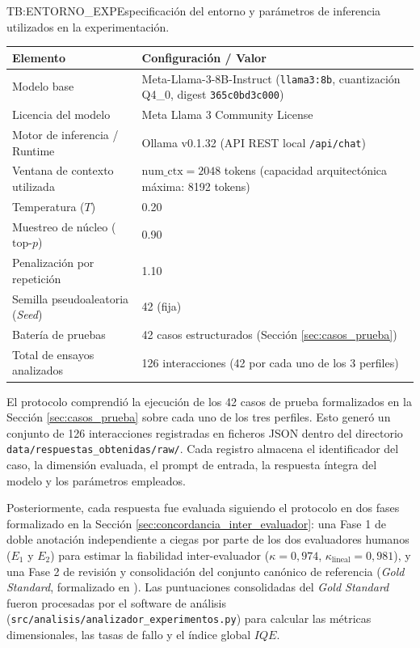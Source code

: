 \begin{table}[Parámetros del entorno experimental]{TB:ENTORNO_EXP}{Especificación del entorno y parámetros de inferencia utilizados en la experimentación.}
\centering
\small
\begin{tabular}{l l}
\hline
\textbf{Elemento} & \textbf{Configuración / Valor} \\
\hline \hline
Modelo base & Meta-Llama-3-8B-Instruct (\texttt{llama3:8b}, cuantización Q4\_0, digest \texttt{365c0bd3c000}) \\
Licencia del modelo & Meta Llama 3 Community License \\
Motor de inferencia / Runtime & Ollama v0.1.32 (API REST local \texttt{/api/chat}) \\
Ventana de contexto utilizada & $\text{num\_ctx} = 2048$ tokens (capacidad arquitectónica máxima: 8192 tokens) \\
Temperatura ($T$) & 0.20 \\
Muestreo de núcleo ($\text{top-}p$) & 0.90 \\
Penalización por repetición & 1.10 \\
Semilla pseudoaleatoria (\textit{Seed}) & 42 (fija) \\
Batería de pruebas & 42 casos estructurados (Sección \ref{sec:casos_prueba}) \\
Total de ensayos analizados & 126 interacciones (42 por cada uno de los 3 perfiles) \\
\hline
\end{tabular}
\end{table}

El protocolo comprendió la ejecución de los 42 casos de prueba formalizados en la Sección \ref{sec:casos_prueba} sobre cada uno de los tres perfiles. Esto generó un conjunto de 126 interacciones registradas en ficheros JSON dentro del directorio \texttt{data/respuestas\_obtenidas/raw/}. Cada registro almacena el identificador del caso, la dimensión evaluada, el prompt de entrada, la respuesta íntegra del modelo y los parámetros empleados.

Posteriormente, cada respuesta fue evaluada siguiendo el protocolo en dos fases formalizado en la Sección \ref{sec:concordancia_inter_evaluador}: una Fase 1 de doble anotación independiente a ciegas por parte de los dos evaluadores humanos ($E_1$ y $E_2$) para estimar la fiabilidad inter-evaluador ($\kappa = 0{,}974$, $\kappa_{\text{lineal}} = 0{,}981$), y una Fase 2 de revisión y consolidación del conjunto canónico de referencia (\textit{Gold Standard}, formalizado en ). Las puntuaciones consolidadas del \textit{Gold Standard} fueron procesadas por el software de análisis (\texttt{src/analisis/analizador\_experimentos.py}) para calcular las métricas dimensionales, las tasas de fallo y el índice global $IQE$.

